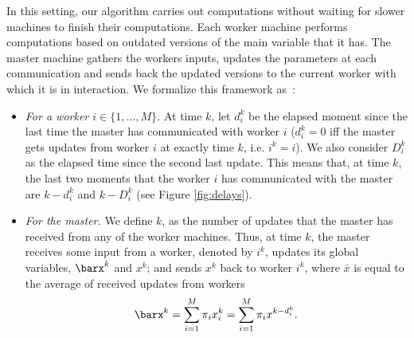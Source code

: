In this setting, our algorithm carries out computations without waiting for slower machines to finish their computations. Each worker machine performs computations based on outdated versions of the main variable that it has. The master machine gathers the workers inputs, updates the parameters at each communication and sends back the updated versions to the current worker with which it is in interaction. We formalize this framework as~: 
\begin{itemize}
\item \emph{For a worker $i\in\{1,\ldots,M\}$.} At time $k$, let $d_i^k$ be the elapsed moment since the last time the master has communicated with worker $i$ ($d_i^k = 0$ iff the master gets updates from worker $i$ at exactly time $k$, i.e. $i^k=i$). We also consider  $D_i^k$ as the elapsed time since the second last update. This means that, at time $k$, the last two moments that the worker $i$ has communicated with the master are $k-d_i^k$ and $k-D_i^k$ (see Figure \ref{fig:delays}). 
\item \emph{For the master.} We define $k$, as the number of updates that the master has received from any of the worker machines. Thus, at time $k$, the master receives some input from a worker, denoted by $i^k$, updates its global variables, $\barx^k$ and $x^k$; and sends $x^k$ back to worker $i^k$, where $\bar{x}$ is equal to the average of received updates from workers
\begin{equation}\label{eq:barx}
\barx^k = \sum_{i=1}^M\pi_i x_i^k = \sum_{i=1}^M \pi_i x^{k-d_i^k}.
\end{equation}
\end{itemize}

